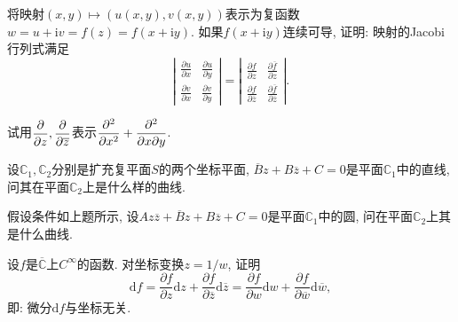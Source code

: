 \begin{yyEx}
    将映射$(x,y)\mapsto (u(x,y),v(x,y))$表示为复函数$w = u+\mathrm{i}v = f(z) = f(x+\mathrm{i}y)$. 如果$f(x+\mathrm{i}y)$连续可导, 证明: 映射的Jacobi行列式满足
    \begin{equation*}
        \left|\begin{array}{cc} 
            \frac{\partial u}{\partial x} & \frac{\partial u}{\partial y} \\
            \frac{\partial v}{\partial x} & \frac{\partial v}{\partial y}
        \end{array}\right| = \left|\begin{array}{cc} 
            \frac{\partial f}{\partial z} & \frac{\partial \overline{f}}{\partial z} \\
            \frac{\partial f}{\partial \overline{z}} & \frac{\partial \overline{f}}{\partial \overline{z}}
        \end{array}\right|.
    \end{equation*}
\end{yyEx}

\begin{yyEx}
    试用$\begin{lgathered}\frac{\partial}{\partial z},\frac{\partial}{\partial \overline{z}}\end{lgathered}$表示$\begin{lgathered}\frac{\partial^2}{\partial x^2}+\frac{\partial^2}{\partial x\partial y }\end{lgathered}$.
\end{yyEx}

\begin{yyEx}
    设$\mathbb{C}_1,\mathbb{C}_2$分别是扩充复平面$S$的两个坐标平面, $\overline{B}z+B\overline{z}+C = 0$是平面$\mathbb{C}_1$中的直线,问其在平面$\mathbb{C}_2$上是什么样的曲线.
\end{yyEx}

\begin{yyEx}
    假设条件如上题所示, 设$Az\overline{z}+\overline{B}z+B\overline{z}+C = 0$是平面$\mathbb{C}_1$中的圆, 问在平面$\mathbb{C}_2$上其是什么曲线.
\end{yyEx}

\begin{yyEx}
    设$f$是$\overline{\mathbb{C}}$上$C^{\infty}$的函数.
    对坐标变换$z=1/w$, 证明\begin{equation*}
        \mathrm{d}f = \frac{\partial f}{\partial z}\mathrm{d}z + \frac{\partial f}{\partial \overline{z}}\mathrm{d}\overline{z} = \frac{\partial f}{\partial w}\mathrm{d}w + \frac{\partial f}{\partial \overline{w}}\mathrm{d}\overline{w},
    \end{equation*}
    即: 微分$\mathrm{d}f$与坐标无关.
\end{yyEx}

